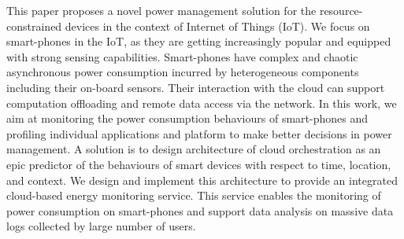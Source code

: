 This paper proposes a novel power management solution for the resource-constrained devices in the context of Internet of Things (IoT). We focus on smart-phones in the IoT, as they are getting increasingly popular and equipped with strong sensing capabilities. Smart-phones have complex and chaotic asynchronous power consumption incurred by heterogeneous components including their on-board sensors. Their interaction with the cloud can support computation offloading and remote data access via the network. In this work, we aim at monitoring the power consumption behaviours of smart-phones and profiling individual applications and platform to make better decisions in power management. A solution is to design architecture of cloud orchestration as an epic predictor of the behaviours of smart devices with respect to time, location, and context. We design and implement this architecture to provide an integrated cloud-based energy monitoring service. This service enables the monitoring of power consumption on smart-phones and support data analysis on massive data logs collected by large number of users.





